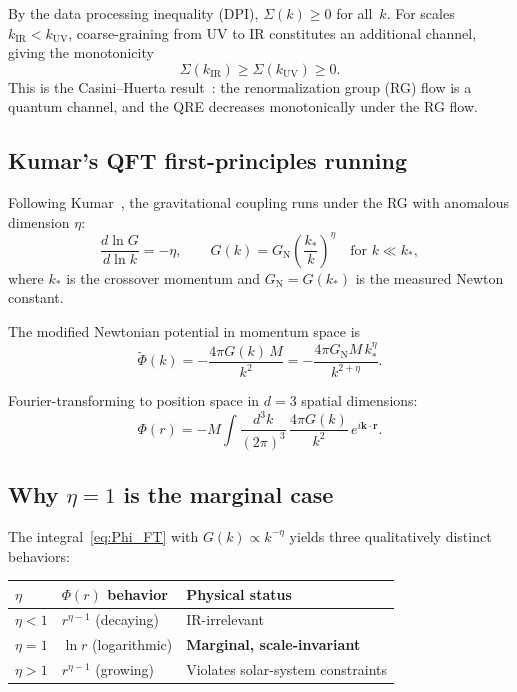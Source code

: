 \documentclass[aps,prd,preprint,superscriptaddress,longbibliography]{revtex4-2}
\newcommand{\GN}{G_{\mathrm{N}}}
\begin{document}
By the data processing inequality (DPI), $\Sigma(k)\ge 0$ for all~$k$.
For scales $k_{\mathrm{IR}} < k_{\mathrm{UV}}$, coarse-graining from
UV to IR constitutes an additional channel, giving the monotonicity
\begin{equation}
\Sigma(k_{\mathrm{IR}}) \ge \Sigma(k_{\mathrm{UV}}) \ge 0.
\label{eq:DPI_monotone}
\end{equation}
This is the Casini--Huerta result~\cite{CasiniTeste2017}: the
renormalization group (RG) flow is a quantum channel, and the QRE
decreases monotonically under the RG flow.

\subsection{Kumar's QFT first-principles running}

Following Kumar~\cite{Kumar2025}, the gravitational coupling runs
under the RG with anomalous dimension $\eta$:
\begin{equation}
\frac{d\ln G}{d\ln k} = -\eta,
\qquad
G(k) = \GN\left(\frac{k_*}{k}\right)^{\!\eta}
\quad\text{for }k \ll k_*,
\label{eq:running_G}
\end{equation}
where $k_*$ is the crossover momentum and $\GN = G(k_*)$ is the
measured Newton constant.

The modified Newtonian potential in momentum space is
\begin{equation}
\tilde{\Phi}(k) = -\frac{4\pi G(k)\,M}{k^2}
= -\frac{4\pi\GN M\, k_*^{\eta}}{k^{2+\eta}}.
\label{eq:Phi_k}
\end{equation}

Fourier-transforming to position space in $d=3$ spatial dimensions:
\begin{equation}
\Phi(r) = -M \int \frac{d^3 k}{(2\pi)^3}\,
\frac{4\pi G(k)}{k^2}\,e^{i\bm{k}\cdot\bm{r}}.
\label{eq:Phi_FT}
\end{equation}

\subsection{Why $\eta=1$ is the marginal case}

The integral~\eqref{eq:Phi_FT} with $G(k)\propto k^{-\eta}$ yields
three qualitatively distinct behaviors:

\begin{center}
\begin{tabular}{lll}
\toprule
$\eta$ & $\Phi(r)$ behavior & Physical status \\
\midrule
$\eta < 1$ & $r^{\eta-1}$ (decaying) & IR-irrelevant \\
$\eta = 1$ & $\ln r$ (logarithmic) & \textbf{Marginal, scale-invariant} \\
$\eta > 1$ & $r^{\eta-1}$ (growing) & Violates solar-system constraints \\
\bottomrule
\end{tabular}
\end{center}
\end{document}
